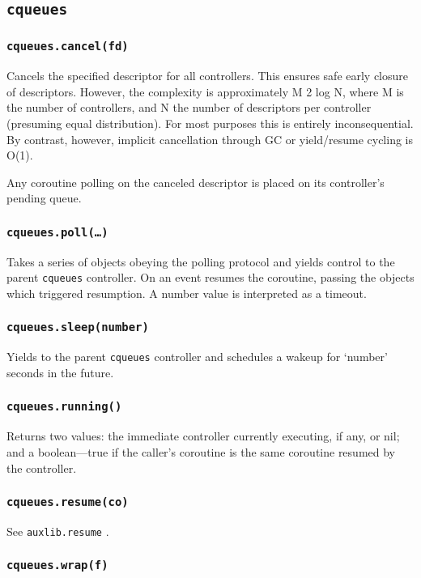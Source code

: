 \documentclass[11pt, oneside]{memoir}
\newcommand{\cqueues}[0]{\texttt{cqueues} }
\newcommand{\routine}[1]{\texttt{#1} }
\newcommand{\fn}[1]{\texttt{#1} }
\newcounter{toccols}
\newenvironment{Module}[1]{
	\subsection{\texttt{#1}}
	\addtocontents{toc}{
		\protect\begin{multicols}{\value{toccols}}
	}
}{
	\addtocontents{toc}{\protect\end{multicols}}
}
\begin{document}
\begin{Module}{\cqueues}
\subsubsection[\routine{cqueues.cancel}]{\routine{cqueues.cancel(fd)}}
Cancels the specified descriptor for all controllers. This ensures safe early closure of descriptors. However, the complexity is approximately M 2 log N, where M is the number of controllers, and N the number of descriptors per controller (presuming equal distribution). For most purposes this is entirely inconsequential. By contrast, however, implicit cancellation through GC or yield/resume cycling is O(1).

Any coroutine polling on the canceled descriptor is placed on its controller's pending queue.

\subsubsection[\routine{cqueues.poll}]{\routine{cqueues.poll(…)}}
Takes a series of objects obeying the polling protocol and yields control to the parent \cqueues controller. On an event resumes the coroutine, passing the objects which triggered resumption. A number value is interpreted as a timeout.

\subsubsection[\routine{cqueues.sleep}]{\routine{cqueues.sleep(number)}}

Yields to the parent \cqueues controller and schedules a wakeup for `number' seconds in the future.

\subsubsection[\routine{cqueues.running}]{\routine{cqueues.running()}}

Returns two values: the immediate controller currently executing, if any, or nil; and a boolean---true if the caller's coroutine is the same coroutine resumed by the controller.

\subsubsection[\routine{cqueues.resume}]{\routine{cqueues.resume(co)}}

See \fn{auxlib.resume}.

\subsubsection[\routine{cqueues.wrap}]{\routine{cqueues.wrap(f)}}


\end{Module}
\end{document}
